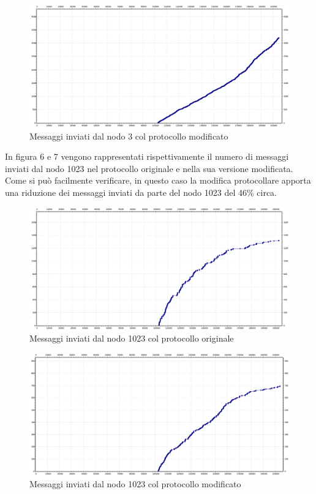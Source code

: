 \documentclass[	
	DIV=calc,
	paper=a4,
	fontsize=11pt,
	onecolumn
]{scrartcl} %
\begin{document}
\begin{figure}[H]
	\centering
	\includegraphics[scale=0.35]{TwoThousandNodesNode3Mod.png}
	\caption{Messaggi inviati dal nodo 3 col protocollo modificato}
	\label{Figura 5}
\end{figure}

In figura 6 e 7 vengono rappresentati rispettivamente il numero di messaggi inviati dal nodo 1023 nel protocollo originale e nella sua versione modificata. Come si può facilmente verificare, in questo caso la modifica protocollare apporta una riduzione dei messaggi inviati da parte del nodo 1023 del 46\% circa.

\begin{figure}[H]
	\centering
	\includegraphics[scale=0.35]{TwoThousandNodesNode1023.png}
	\caption{Messaggi inviati dal nodo 1023 col protocollo originale}
	\label{Figura 6}
\end{figure}

\begin{figure}[H]
	\centering
	\includegraphics[scale=0.35]{TwoThousandNodesNode1023Mod.png}
	\caption{Messaggi inviati dal nodo 1023 col protocollo modificato}
	\label{Figura 7}
\end{figure}
\end{document}
